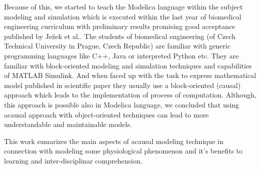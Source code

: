 \documentclass[letterpaper, 10 pt, conference]{ieeeconf}  %
\begin{document}

Because of this, we started to teach the Modelica language within the subject modeling and simulation which is executed within the last year of biomedical engineering curriculum with preliminary results promising good acceptance published by Ježek et al.\cite{Jezek2012}. The students of biomedical engineering (of Czech Technical University in Prague, Czech Republic) are familiar with generic programming languages like C++, Java or interpreted Python etc. They are familiar with block-oriented modeling and simulation techniques and capabilities of MATLAB Simulink. And when faced up with the task to express mathematical model published in scientific paper they usually use a block-oriented (causal) approach which leads to the implementation of process of computation. Although, this approach is possible also in Modelica language, we concluded that using acausal approach with  object-oriented techniques can lead to more understandable and maintainable models.

This work sumarizes the main aspects of acausal modeling technique in connection with modeling some physiological phenomenon and it's benefits to learning and inter-disciplinar comprehension.


\end{document}
